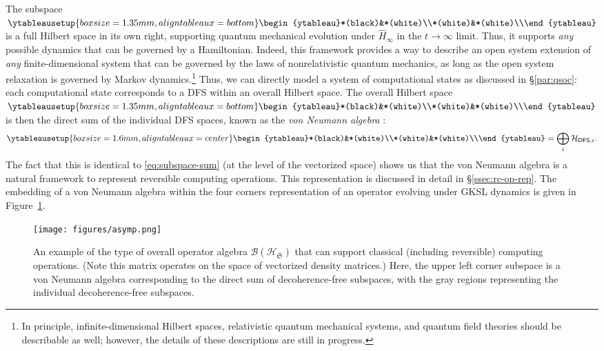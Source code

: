 \documentclass[preprints,article,accept,moreauthors,pdftex]{Definitions/mdpi}
\begin{document}
\begin{paracol}{2}
The subspace $\!\:\ytableausetup{boxsize = 1.35mm, aligntableaux = bottom}\begin{ytableau}*(black)&*(white)\\*(white)&*(white)\\\end{ytableau}\!\:$ is a full Hilbert space in its own right, supporting quantum mechanical evolution under $\widehat{H}_{\infty}$ in the $t\rightarrow\infty$ limit. Thus, it supports \emph{any} possible dynamics that can be governed by a Hamiltonian. Indeed, this framework provides a way to describe an open system extension of \emph{any} finite-dimensional system that can be governed by the laws of nonrelativistic quantum mechanics, as long as the open system relaxation is governed by Markov dynamics.\footnote{In principle, infinite-dimensional Hilbert spaces, relativistic quantum mechanical systems, and quantum field theories should be describable as well; however, the details of these descriptions are still in progress.} Thus, we can directly model a system of computational states as discussed in \S\ref{par:qsoc}: each computational state corresponds to a DFS within an overall Hilbert space. The overall Hilbert space $\!\;\ytableausetup{boxsize = 1.35mm, aligntableaux = bottom}\begin{ytableau}*(black)&*(white)\\*(white)&*(white)\\\end{ytableau}\!\;$ is then the direct sum of the individual DFS spaces, known as the \emph{von Neumann algebra} \cite{BN08,TV08,BKNPV10,DFSU16,PP17}: 
\begin{equation}
    \label{eq:vN-algebra}
     \ytableausetup{boxsize = 1.6mm, aligntableaux = center}\begin{ytableau}*(black)&*(white)\\*(white)&*(white)\\\end{ytableau} = \bigoplus\limits_{i}\mathcal{H}_{\mathsf{DFS},i}.
\end{equation}
The fact that this is identical to \eqref{eq:subspace-sum} (at the level of the vectorized space) shows us that the von Neumann algebra is a natural framework to represent reversible computing operations. This representation is discussed in detail in \S\ref{ssec:rc-op-rep}. The embedding of a von Neumann algebra within the four corners representation of an operator evolving under GKSL dynamics is given in Figure~\ref{fig:asymp}.
\begin{figure}[H]
    \centerline{\texttt{[image: figures/asymp.png]}}
    \caption{An example of the type of overall operator algebra $\mathcal{B}\left(\mathcal{H}_{\mathfrak{S}}\right)$ that can support classical (including reversible) computing operations. (Note this matrix operates on the space of vectorized density matrices.) Here, the upper left corner subspace is a von Neumann algebra corresponding to the direct sum of decoherence-free subspaces, with the gray regions representing the individual decoherence-free subspaces. 
    \label{fig:asymp}}
\end{figure}


\end{paracol}
\end{document}

